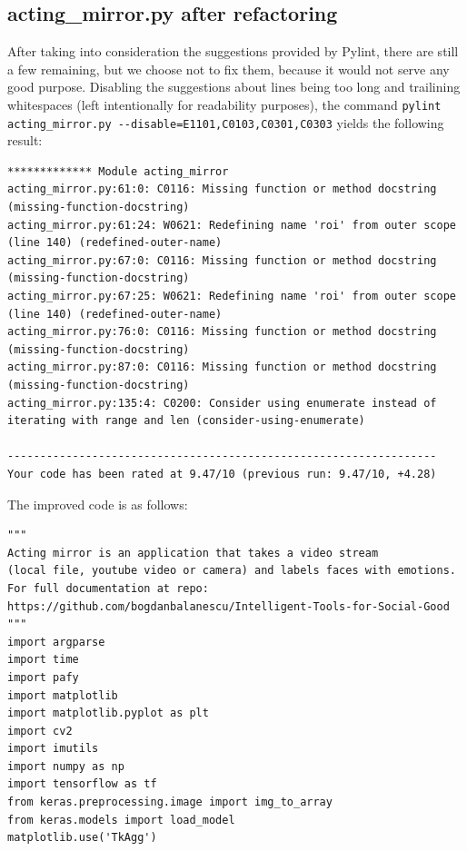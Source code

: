 \documentclass[runningheads,a4paper,11pt]{report}
\begin{document}
\begin{appendices}
\subsection{acting\_mirror.py after refactoring}
After taking into consideration the suggestions provided by Pylint, there are still a few remaining, but we choose not to fix them, because it would not serve any good purpose. Disabling the suggestions about lines being too long and trailining whitespaces (left intentionally for readability purposes), the command \verb|pylint acting_mirror.py --disable=E1101,C0103,C0301,C0303| yields the following result:
\begin{lstlisting}
************* Module acting_mirror
acting_mirror.py:61:0: C0116: Missing function or method docstring (missing-function-docstring)
acting_mirror.py:61:24: W0621: Redefining name 'roi' from outer scope (line 140) (redefined-outer-name)
acting_mirror.py:67:0: C0116: Missing function or method docstring (missing-function-docstring)
acting_mirror.py:67:25: W0621: Redefining name 'roi' from outer scope (line 140) (redefined-outer-name)
acting_mirror.py:76:0: C0116: Missing function or method docstring (missing-function-docstring)
acting_mirror.py:87:0: C0116: Missing function or method docstring (missing-function-docstring)
acting_mirror.py:135:4: C0200: Consider using enumerate instead of iterating with range and len (consider-using-enumerate)

------------------------------------------------------------------
Your code has been rated at 9.47/10 (previous run: 9.47/10, +4.28)
\end{lstlisting}

The improved code is as follows:
\begin{lstlisting}
"""
Acting mirror is an application that takes a video stream 
(local file, youtube video or camera) and labels faces with emotions.
For full documentation at repo: https://github.com/bogdanbalanescu/Intelligent-Tools-for-Social-Good
"""
import argparse
import time
import pafy
import matplotlib
import matplotlib.pyplot as plt
import cv2
import imutils
import numpy as np
import tensorflow as tf
from keras.preprocessing.image import img_to_array
from keras.models import load_model
matplotlib.use('TkAgg')


\end{lstlisting}
\end{appendices}
\end{document}
